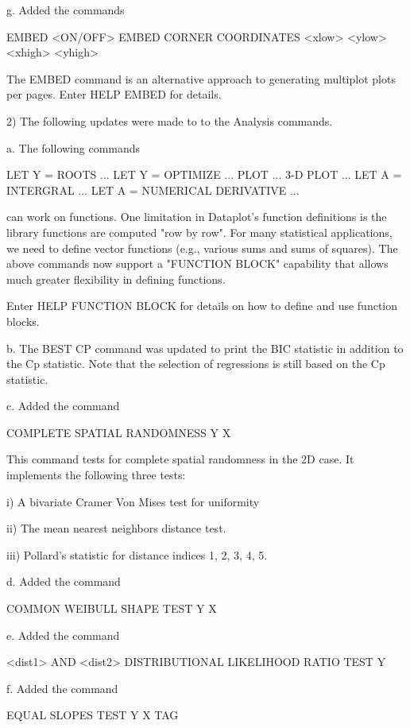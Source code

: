     g. Added the commands

         EMBED <ON/OFF>
         EMBED CORNER COORDINATES <xlow> <ylow> <xhigh> <yhigh>

       The EMBED command is an alternative approach to generating
       multiplot plots per pages.  Enter HELP EMBED for details.

 2) The following updates were made to to the Analysis commands.

    a. The following commands

           LET Y = ROOTS ...
           LET Y = OPTIMIZE ...
           PLOT ...
           3-D PLOT ...
           LET A = INTERGRAL ...
           LET A = NUMERICAL DERIVATIVE ...

       can work on functions.  One limitation in Dataplot's function
       definitions is the library functions are computed "row by row".
       For many statistical applications, we need to define vector
       functions (e.g., various sums and sums of squares).  The above
       commands now support a "FUNCTION BLOCK" capability that allows
       much greater flexibility in defining functions.

       Enter HELP FUNCTION BLOCK for details on how to define and use
       function blocks.

    b. The BEST CP command was updated to print the BIC statistic
       in addition to the Cp statistic.  Note that the selection
       of regressions is still based on the Cp statistic.

    c. Added the command

         COMPLETE SPATIAL RANDOMNESS Y X

       This command tests for complete spatial randomness in the 2D case.
       It implements the following three tests:

          i) A bivariate Cramer Von Mises test for uniformity

         ii) The mean nearest neighbors distance test.

        iii) Pollard's statistic for distance indices 1, 2, 3, 4, 5.

    d. Added the command

         COMMON WEIBULL SHAPE TEST Y X

    e. Added the command

         <dist1> AND <dist2> DISTRIBUTIONAL LIKELIHOOD RATIO TEST Y

    f. Added the command

         EQUAL SLOPES TEST Y X TAG

